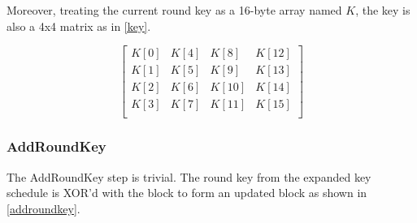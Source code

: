 \documentclass[a4paper,10pt,conference]{IEEEtran}
\begin{document}
Moreover, treating the current round key as a 16-byte array named $K$, the key is also a 4x4 matrix as in \ref{key}.

\begin{equation}
 \begin{bmatrix}
  K[0] & K[4] & K[8] & K[12] \\
  K[1] & K[5] & K[9] & K[13] \\
  K[2] & K[6] & K[10] & K[14] \\
  K[3] & K[7] & K[11] & K[15] \\
 \end{bmatrix}
\label{key}
\end{equation}

\subsubsection{AddRoundKey}

The AddRoundKey step is trivial.  The round key from the expanded key schedule is XOR'd with the block to form an updated block as shown in \ref{addroundkey}.
\end{document}
